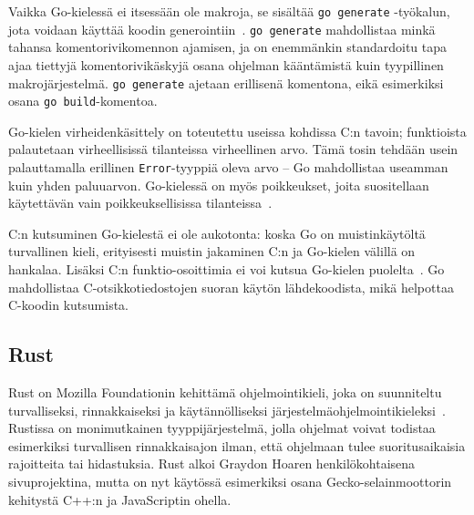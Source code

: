 Vaikka Go-kielessä ei itsessään ole makroja, se sisältää \texttt{go~generate}
-työkalun, jota voidaan käyttää koodin generointiin~\citep{gogenerate}.
\texttt{go~generate} mahdollistaa minkä tahansa komentorivikomennon ajamisen,
ja on enemmänkin standardoitu tapa ajaa tiettyjä komentorivikäskyjä osana
ohjelman kääntämistä kuin tyypillinen makrojärjestelmä.
\texttt{\mbox{go~generate}} ajetaan erillisenä komentona,
eikä esimerkiksi osana \texttt{\mbox{go~build}}-komentoa.



Go-kielen virheidenkäsittely on toteutettu useissa kohdissa C:n tavoin;
funktioista palautetaan virheellisissä tilanteissa virheellinen arvo. Tämä
tosin tehdään usein palauttamalla erillinen \texttt{Error}-tyyppiä oleva arvo
-- Go mahdollistaa useamman kuin yhden paluuarvon. Go-kielessä on myös
poikkeukset, joita suositellaan käytettävän vain poikkeuksellisissa
tilanteissa~\citep{effectivego}.

C:n kutsuminen Go-kielestä ei ole aukotonta: koska Go on muistinkäytöltä
turvallinen kieli, erityisesti muistin jakaminen C:n ja Go-kielen välillä on
hankalaa. Lisäksi C:n funktio-osoittimia ei voi kutsua Go-kielen
puolelta~\citep{cgo}. Go mahdollistaa C-otsikkotiedostojen suoran käytön
lähdekoodista, mikä helpottaa C-koodin kutsumista.

\subsection{Rust}

Rust on Mozilla Foundationin kehittämä ohjelmointikieli, joka on suunniteltu
turvalliseksi, rinnakkaiseksi ja käytännölliseksi
järjestelmäohjelmointikieleksi~\citep{rustfaq}. Rustissa on monimutkainen
tyyppijärjestelmä, jolla ohjelmat voivat todistaa esimerkiksi turvallisen
rinnakkaisajon ilman, että ohjelmaan tulee suoritusaikaisia rajoitteita tai
hidastuksia. Rust alkoi Graydon Hoaren henkilökohtaisena sivuprojektina, mutta
on nyt käytössä esimerkiksi osana Gecko-selainmoottorin kehitystä C++:n ja
JavaScriptin ohella.

